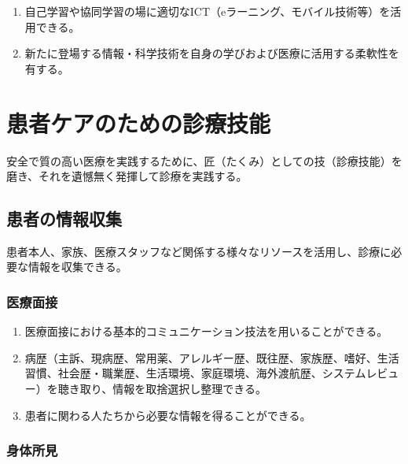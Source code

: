 \begin{enumerate}
\def\labelenumi{\arabic{enumi}.}
\tightlist
\item
  自己学習や協同学習の場に適切なICT（eラーニング、モバイル技術等）を活用できる。
\item
  新たに登場する情報・科学技術を自身の学びおよび医療に活用する柔軟性を有する。
\end{enumerate}

\newpage

\hypertarget{ux60a3ux8005ux30b1ux30a2ux306eux305fux3081ux306eux8a3aux7642ux6280ux80fd}{%
\section{患者ケアのための診療技能}\label{ux60a3ux8005ux30b1ux30a2ux306eux305fux3081ux306eux8a3aux7642ux6280ux80fd}}

安全で質の高い医療を実践するために、匠（たくみ）としての技（診療技能）を磨き、それを遺憾無く発揮して診療を実践する。

\hypertarget{ux60a3ux8005ux306eux60c5ux5831ux53ceux96c6}{%
\subsection{患者の情報収集}\label{ux60a3ux8005ux306eux60c5ux5831ux53ceux96c6}}

患者本人、家族、医療スタッフなど関係する様々なリソースを活用し、診療に必要な情報を収集できる。

\hypertarget{ux533bux7642ux9762ux63a5}{%
\subsubsection{医療面接}\label{ux533bux7642ux9762ux63a5}}

\begin{enumerate}
\def\labelenumi{\arabic{enumi}.}
\tightlist
\item
  医療面接における基本的コミュニケーション技法を用いることができる。
\item
  病歴（主訴、現病歴、常用薬、アレルギー歴、既往歴、家族歴、嗜好、生活習慣、社会歴・職業歴、生活環境、家庭環境、海外渡航歴、システムレビュー）を聴き取り、情報を取捨選択し整理できる。
\item
  患者に関わる人たちから必要な情報を得ることができる。
\end{enumerate}

\hypertarget{ux8eabux4f53ux6240ux898b}{%
\subsubsection{身体所見}\label{ux8eabux4f53ux6240ux898b}}

